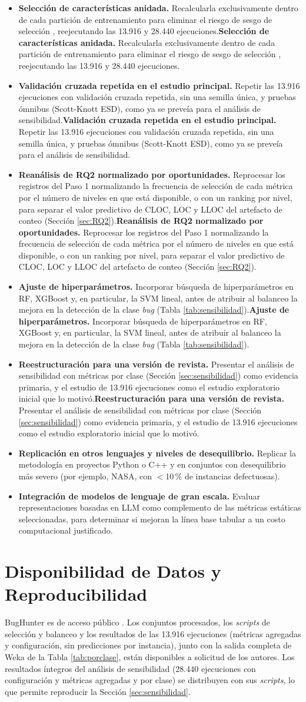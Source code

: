\documentclass[conference,a4paper]{IEEEtran}
\newif\ifmarcarcambios
\newcommand{\cambio}[1]{\ifmarcarcambios\ifvmode\leavevmode\fi{\color{azulcambio}#1}\else#1\fi}
\begin{document}
\begin{itemize}
\item \cambio{\textbf{Selección de características anidada.} Recalcularla exclusivamente dentro de cada partición de entrenamiento para eliminar el riesgo de sesgo de selección \cite{ambroise2002,cawley2010}, reejecutando las 13.916 y 28.440 ejecuciones.}
\item \cambio{\textbf{Validación cruzada repetida en el estudio principal.} Repetir las 13.916 ejecuciones con validación cruzada repetida, sin una semilla única, y pruebas ómnibus (Scott-Knott ESD), como ya se preveía para el análisis de sensibilidad.}
\item \cambio{\textbf{Reanálisis de RQ2 normalizado por oportunidades.} Reprocesar los registros del Paso 1 normalizando la frecuencia de selección de cada métrica por el número de niveles en que está disponible, o con un ranking por nivel, para separar el valor predictivo de CLOC, LOC y LLOC del artefacto de conteo (Sección \ref{sec:RQ2}).}
\item \cambio{\textbf{Ajuste de hiperparámetros.} Incorporar búsqueda de hiperparámetros en RF, XGBoost y, en particular, la SVM lineal, antes de atribuir al balanceo la mejora en la detección de la clase \textit{bug} (Tabla \ref{tab:sensibilidad}).}
\item \cambio{\textbf{Reestructuración para una versión de revista.} Presentar el análisis de sensibilidad con métricas por clase (Sección \ref{sec:sensibilidad}) como evidencia primaria, y el estudio de 13.916 ejecuciones como el estudio exploratorio inicial que lo motivó.}
\item \textbf{Replicación en otros lenguajes y niveles de desequilibrio.} Replicar la metodología en proyectos Python o C++ y en conjuntos con desequilibrio más severo (por ejemplo, NASA, con $<$10\,\% de instancias defectuosas).
\item \textbf{Integración de modelos de lenguaje de gran escala.} Evaluar representaciones basadas en LLM \cite{hou2024,fan2023} como complemento de las métricas estáticas seleccionadas, para determinar si mejoran la línea base tabular a un costo computacional justificado.
\end{itemize}

\section*{Disponibilidad de Datos y Reproducibilidad}
BugHunter es de acceso público \cite{ferenc2020}. Los conjuntos procesados, los \textit{scripts} de selección y balanceo y los resultados de las 13.916 ejecuciones (métricas agregadas y configuración, sin predicciones por instancia), junto con la salida completa de Weka de la Tabla \ref{tab:porclase}, están disponibles a solicitud de los autores. Los resultados íntegros del análisis de sensibilidad (28.440 ejecuciones con configuración y métricas agregadas y por clase) se distribuyen con sus \textit{scripts}, lo que permite reproducir la Sección \ref{sec:sensibilidad}.
\end{document}
